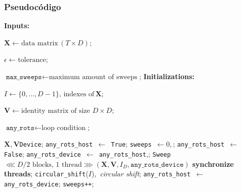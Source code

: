 \begin{frame}
\frametitle{Pseudocódigo}
\begin{algorithm}[H]
    \tiny
    \caption{CUDA based One-Sided Jacobi implementation}
    \begin{algorithmic}[1]
        \State \textbf{Inputs:}\par $\mathbf{X} \gets \text{data matrix}\, (T \times D)$; \par
        $\epsilon \gets \text{tolerance}$; \par
        $\texttt{max\_sweeps} \gets \text{maximum amount of sweeps}$;
        \State \textbf{Initializations:}\par
        $I \gets \{0,\dots,D-1\},\, \text{indexes of}\, \mathbf{X}$;\par
        $\mathbf{V} \gets \text{identity matrix of size }D\times D$;\par
        $\texttt{any\_rots} \gets \text{loop condition}$;\par
        \State {}$\mathbf{X}, \mathbf{V}$\texttt{Device};
        \State \texttt{any\_rots\_host }$\gets$\texttt{ True};
        \State \texttt{sweeps }$\gets 0,$;
            \State \texttt{any\_rots\_host }$\gets$\texttt{ False};
            \State \texttt{any\_rots\_device }$\gets$\texttt{ any\_rots\_host},;
                \State \texttt{Sweep }$\lll D/2\text{ blocks, }1\text{ thread}\ggg(\mathbf{X},\mathbf{V},I_D,\texttt{any\_rots\_device})$
                \State \textbf{synchronize threads};
                \State \texttt{circular\_shift}($I$),\, \textit{circular shift};
            \EndFor
            \State \texttt{any\_rots\_host }$\gets$\texttt{ any\_rots\_device};
            \State \texttt{sweeps++};
        \EndWhile
    \end{algorithmic}
\end{algorithm}
\end{frame}

